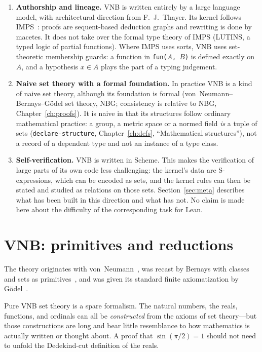 \begin{enumerate}
\item \textbf{Authorship and lineage.}  VNB is written entirely by a large
  language model, with architectural direction from F.~J.~Thayer.  Its
  kernel follows IMPS~\cite{IMPS}: proofs are sequent-based deduction
  graphs and rewriting is done by macetes.  It does not take over the
  formal type theory of IMPS (LUTINS, a typed logic of partial
  functions).  Where IMPS uses sorts, VNB uses set-theoretic membership
  guards: a function in \texttt{fun($A$, $B$)} is defined exactly on $A$,
  and a hypothesis $x \in A$ plays the part of a typing judgement.
\item \textbf{Naive set theory with a formal foundation.}  In practice VNB
  is a kind of naive set theory, although its foundation is formal
  (von~Neumann--Bernays--G\"odel set theory, NBG; consistency is relative to
  NBG, Chapter~\ref{ch:proofs}).  It is naive in that its structures follow
  ordinary mathematical practice: a group, a metric space or a normed field
  \emph{is} a tuple of sets (\texttt{declare-structure}, Chapter~\ref{ch:defs},
  ``Mathematical structures''), not a record of a dependent type and not an
  instance of a type class.
\item \textbf{Self-verification.}  VNB is written in Scheme.  This makes
  the verification of large parts of its own code less challenging: the
  kernel's data are S-expressions, which can be encoded as sets, and the
  kernel rules can then be stated and studied as relations on those sets.
  Section~\ref{sec:meta} describes what has been built in this direction
  and what has not.  No claim is made here about the difficulty of the
  corresponding task for Lean.
\end{enumerate}

\section{VNB: primitives and reductions}
\label{sec:primitives}

The theory originates with von~Neumann~\cite{vonNeumann1925}, was recast
by Bernays with classes and sets as primitives~\cite{Bernays1937}, and was
given its standard finite axiomatization by
G\"odel~\cite{Godel1940}.

Pure VNB set theory is a spare formalism.  The natural numbers, the
reals, functions, and ordinals can all be \emph{constructed} from the
axioms of set theory---but those constructions are long and bear little
resemblance to how mathematics is actually written or thought
about.  A proof that $\sin(\pi/2) = 1$ should not need to unfold the
Dedekind-cut definition of the reals.

